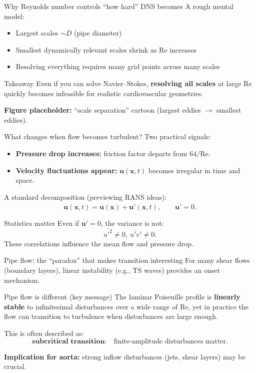 \documentclass[aspectratio=169]{beamer}
\newcommand{\x}{\bm{x}}
\newcommand{\uu}{\bm{u}}
\newcommand{\Rey}{\mathrm{Re}}
\newcommand{\avg}[1]{\overline{#1}}
\newcommand{\ubar}{\avg{\uu}}
\newcommand{\up}{\uu'}
\begin{document}
\begin{frame}{Why Reynolds number controls ``how hard'' DNS becomes}
A rough mental model:
\begin{itemize}
  \item Largest scales $\sim D$ (pipe diameter)
  \item Smallest dynamically relevant scales shrink as $\Rey$ increases
  \item Resolving everything requires many grid points across many scales
\end{itemize}

\begin{block}{Takeaway}
Even if you can solve Navier--Stokes, \textbf{resolving all scales} at large $\Rey$ quickly becomes infeasible for realistic cardiovascular geometries.
\end{block}

\textbf{Figure placeholder:} ``scale separation'' cartoon (largest eddies $\to$ smallest eddies).
\end{frame}

\begin{frame}{What changes when flow becomes turbulent?}
Two practical signals:
\begin{itemize}
  \item \textbf{Pressure drop increases:} friction factor departs from $64/\Rey$.
  \item \textbf{Velocity fluctuations appear:} $\uu(\x,t)$ becomes irregular in time and space.
\end{itemize}

A standard decomposition (previewing RANS ideas):
\[
\uu(\x,t)=\ubar(\x)+\up(\x,t),\qquad \avg{\up}=0.
\]

\begin{block}{Statistics matter}
Even if $\avg{\up}=0$, the variance is not:
\[
\avg{u'^2}\neq 0,\ \avg{u'v'}\neq 0.
\]
These correlations influence the mean flow and pressure drop.
\end{block}
\end{frame}

\begin{frame}{Pipe flow: the ``paradox'' that makes transition interesting}
For many shear flows (boundary layers), linear instability (e.g., TS waves) provides an onset mechanism.

\begin{block}{Pipe flow is different (key message)}
The laminar Poiseuille profile is \textbf{linearly stable} to infinitesimal disturbances over a wide range of $\Rey$,
yet in practice the flow can transition to turbulence when disturbances are large enough.
\end{block}

This is often described as:
\[
\textbf{subcritical transition:}\quad \text{finite-amplitude disturbances matter.}
\]

\textbf{Implication for aorta:} strong inflow disturbances (jets, shear layers) may be crucial.
\end{frame}
\end{document}

